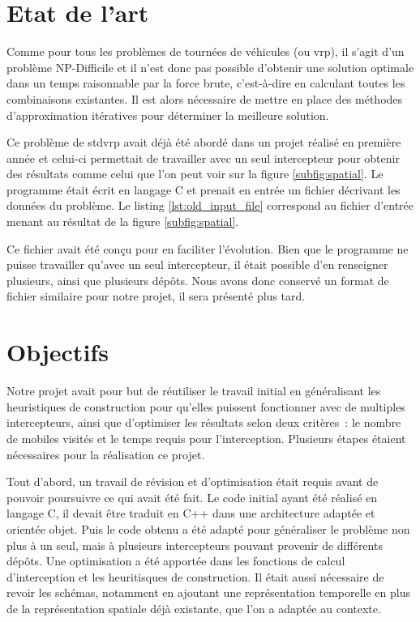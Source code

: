 	\section{Etat de l'art}
		Comme pour tous les problèmes de tournées de véhicules (ou \acrlong{vrp}), il s'agit d'un problème NP-Difficile et il n'est donc pas possible d'obtenir une solution optimale dans un temps raisonnable par la force brute, c'est-à-dire en calculant toutes les combinaisons existantes. Il est alors nécessaire de mettre en place des méthodes d'approximation itératives pour déterminer la meilleure solution.

		Ce problème de \acrlong{stdvrp} avait déjà été abordé dans un projet réalisé en première année et celui-ci permettait de travailler avec un seul intercepteur pour obtenir des résultats comme celui que l'on peut voir sur la figure \ref{subfig:spatial}. Le programme était écrit en langage C et prenait en entrée un fichier décrivant les données du problème. Le listing \ref{lst:old_input_file} correspond au fichier d'entrée menant au résultat de la figure \ref{subfig:spatial}.

		Ce fichier avait été conçu pour en faciliter l'évolution. Bien que le programme ne puisse travailler qu'avec un seul intercepteur, il était possible d'en renseigner plusieurs, ainsi que plusieurs dépôts. Nous avons donc conservé un format de fichier similaire pour notre projet, il sera présenté plus tard.

		\begin{code}
			\label{lst:old_input_file}
		\end{code}

	\section{Objectifs}
		Notre projet avait pour but de réutiliser le travail initial en généralisant les heuristiques de construction pour qu'elles puissent fonctionner avec de multiples intercepteurs, ainsi que d'optimiser les résultats selon deux critères : le nombre de mobiles visités et le temps requis pour l'interception.
		Plusieurs étapes étaient nécessaires pour la réalisation ce projet.

		Tout d'abord, un travail de révision et d'optimisation était requis avant de pouvoir poursuivre ce qui avait été fait. Le code initial ayant été réalisé en langage C, il devait être traduit en C++ dans une architecture adaptée et orientée objet. Puis le code obtenu a été adapté pour généraliser le problème non plus à un seul, mais à plusieurs intercepteurs pouvant provenir de différents dépôts. Une optimisation a été apportée dans les fonctions de calcul d'interception et les heuritisques de construction. Il était aussi nécessaire de revoir les schémas, notamment en ajoutant une représentation temporelle en plus de la représentation spatiale déjà existante, que l'on a adaptée au contexte.

